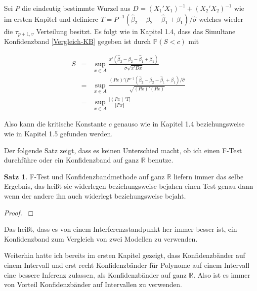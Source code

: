 \documentclass[12pt,a4paper]{article}
\theoremstyle{definition}
\theoremstyle{definition}
\newtheorem{Satz}[Definition]{Satz}
\theoremstyle{definition}
\begin{document}
Sei $P$ die eindeutig bestimmte Wurzel aus $D = (X_1'X_1)^{-1} + (X_2'X_2)^{-1}$ wie im ersten Kapitel und definiere $T=P^{-1}(\hat{\beta}_2 - \beta_2 - \hat{\beta}_1 + \beta_1)/\hat{\sigma}$ welches wieder die $\tau_{p+1,v}$ Verteilung besitzt. Es folgt wie in Kapitel 1.4, dass das Simultane Konfidenzband \eqref{Vergleich-KB} gegeben ist durch $\mathbb{P}(S<c)$ mit

\begin{eqnarray*}
S &=& \sup_{x \in A} \frac{x' (\hat{\beta}_2-\beta_2-\hat{\beta}_1+\beta_1)}{\hat{\sigma}\sqrt{x' D x}}\\
&=& \sup_{x \in A} \frac{(Px)' (P^{-1} (\hat{\beta}_2-\beta_2-\hat{\beta}_1+\beta_1)/\hat{\sigma}}{\sqrt{(Px)'(Px)}} \\
&=& \sup_{x \in A} \frac{\vert (Px)' T \vert}{\Vert Px \Vert}
\end{eqnarray*}

Also kann die kritische Konstante $c$ genauso wie in Kapitel 1.4 beziehungsweise wie in Kapitel 1.5 gefunden werden.

Der folgende Satz zeigt, dass es keinen Unterschied macht, ob ich einen F-Test durchführe oder ein Konfidenzband auf ganz $\mathbb{R}$ benutze.

\begin{Satz}
F-Test und Konfidenzbandmethode auf ganz $\mathbb{R}$ liefern immer das selbe Ergebnis, das heißt sie widerlegen beziehungsweise bejahen einen Test genau dann wenn der andere ihn auch widerlegt beziehungsweise bejaht.
\end{Satz}

\begin{proof}
\cite[67]{Liu64}
\end{proof}

Das heißt, dass es von einem Interferenzstandpunkt her immer besser ist, ein Konfidenzband zum Vergleich von zwei Modellen zu verwenden.

Weiterhin hatte ich bereits im ersten Kapitel gezeigt, dass Konfidenzbänder auf einem Intervall und erst recht Konfidenzbänder für Polynome auf einem Intervall eine bessere Inferenz zulassen, als Konfidenzbänder auf ganz $\mathbb{R}$. Also ist es immer von Vorteil Konfidenzbänder auf Intervallen zu verwenden.

\end{document}

